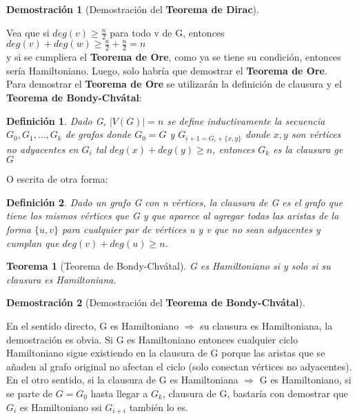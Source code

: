 \documentclass[a4paper,1pt]{report}
\newtheorem*{teo}{Teorema}
\newtheorem*{dem}{Demostración}
\newtheorem*{dfn}{Definición}
\begin{document}
 \begin{dem}[Demostración del \textbf{Teorema de Dirac}] \end{dem}
 Vea que si $deg(v)\geq \frac{n}{2}$ para todo v de G, entonces\\ 
 
 $deg(v)+deg(w)\geq \frac{n}{2}+\frac{n}{2}=n$ \\
 
 y si se cumpliera el \textbf{Teorema de Ore}, como ya se tiene su condición, entonces sería Hamiltoniano. Luego, solo habría que demostrar el \textbf{Teorema de Ore}.\\
  
 Para demostrar el \textbf{Teorema de Ore} se utilizarán la definición de clausura y el \textbf{Teorema de Bondy-Chvátal}:
 
  \begin{dfn}
 Dado G, $|V(G)|=n$ se define inductivamente la secuencia $G_0,G_1,\dots,G_k$ de grafos donde
 $G_0=G$ y $G_{i+1=G_i+\{x,y\}}$ donde $x,y$ son vértices no adyacentes en $G_i$ tal $deg(x)+deg(y)\geq n$, entonces $G_k$ es la clausura ge $G$
 \end{dfn}
 
 O escrita de otra forma:
 
  \begin{dfn}
  Dado un grafo G con n vértices, la clausura de G es el grafo que tiene los mismos vértices que G y que aparece al agregar todas las aristas de la forma $\{u, v\}$ para cualquier par de vértices u y v que no sean adyacentes y cumplan que 
  $deg(v) + deg(u)\geq n$.
 \end{dfn}
 
 \begin{teo}[Teorema de Bondy-Chvátal]
  G es Hamiltoniano si y solo si su clausura es Hamiltoniana.
 \end{teo}

  \begin{dem}[Demostración del \textbf{Teorema de Bondy-Chvátal}] \end{dem}

En el sentido directo, G es Hamiltoniano $\Rightarrow$ su clausura es Hamiltoniana, la demostración es obvia. Si G es Hamiltoniano entonces cualquier ciclo Hamiltoniano sigue existiendo en la clausura de G porque las aristas que se añaden al grafo original no afectan el ciclo (solo conectan vértices no adyacentes).\\
  
En el otro sentido, si la clausura de G es Hamiltoniana $\Rightarrow$ G es Hamiltoniano, si se parte de $G=G_0$ hasta llegar a $G_k$, clausura de G, bastaría con demostrar que $G_i$ es Hamiltoniano ssi $G_{i+i}$ también lo es.
\end{document}
